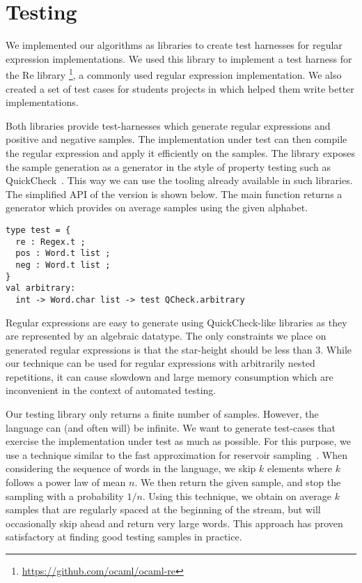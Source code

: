 \section{Testing}
\label{sec:test}

We implemented our algorithms as libraries to create
test harnesses for regular expression implementations.
We used this library to implement a test harness for the \ocaml Re library%
\footnote{\url{https://github.com/ocaml/ocaml-re}},
a commonly used \ocaml regular expression implementation.
%
We also created a set of test cases for students projects in \haskell
which helped them write better implementations.

Both libraries provide test-harnesses which generate
regular expressions and positive and negative samples. The
implementation under test can then compile the regular expression and apply it
efficiently on the samples.
The library exposes the sample generation as a generator in the style of
property testing such as QuickCheck~\cite{DBLP:conf/icfp/ClaessenH00}.
This way we can use the tooling already available in such libraries.
%
The simplified API of the \ocaml version is shown below.
The main function  returns a generator
which provides on average  samples using the given alphabet.

\begin{lstlisting}
type test = {
  re : Regex.t ;
  pos : Word.t list ;
  neg : Word.t list ;
}
val arbitrary:
  int -> Word.char list -> test QCheck.arbitrary
\end{lstlisting}

Regular expressions are easy to generate using QuickCheck-like
libraries as they are represented by an algebraic datatype.  The only
constraints we place on generated regular expressions is that
the star-height should be less than 3. While our technique can be used for
regular expressions with arbitrarily nested repetitions, it can cause
slowdown and large memory consumption which are
inconvenient in the context of automated testing.

Our testing library only returns a finite number of samples. However,
the language can (and often will) be infinite. We want to generate
test-cases that exercise the implementation under test as much as
possible. For this purpose, we use a technique similar to the fast
approximation for reservoir
sampling~\citep{DBLP:journals/toms/Vitter87}.  When considering the
sequence of words in the language, we skip $k$ elements where $k$
follows a power law of mean $n$. We then return the given sample, and
stop the sampling with a probability $1/n$.
%
Using this technique, we obtain on average $k$ samples that are regularly
spaced at the beginning of the stream, but will occasionally skip ahead
and return very large words. This approach has proven satisfactory at finding good
testing samples in practice.

